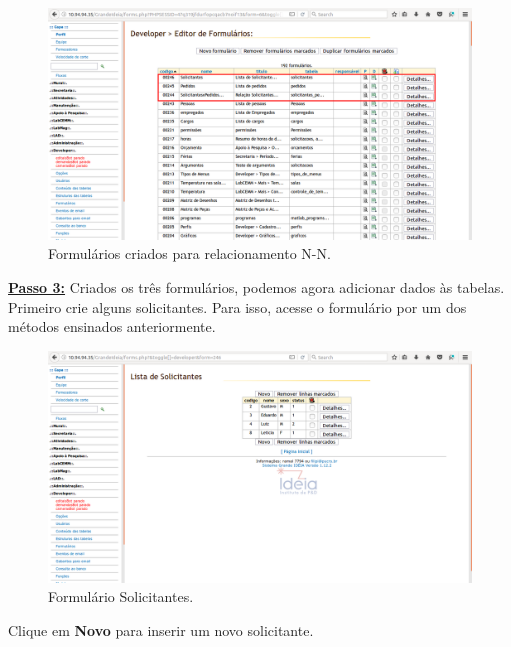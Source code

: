 \documentclass[9pt]{report}
\begin{document}
{       \begin{figure}[H]
        \includegraphics[width=\textwidth]{2_Formularios/4_Relacionamento_N_N/41.png}
        \caption{Formulários criados para relacionamento N-N.}
        \label{fig:formsNN}
       \end{figure}

       \underline{\textbf{Passo 3:}} Criados os três formulários,
       podemos agora adicionar dados às tabelas. Primeiro crie alguns
       solicitantes. Para isso, acesse o formulário por um dos
       métodos ensinados anteriormente.

       \begin{figure}[H]
        \includegraphics[width=\textwidth]{2_Formularios/4_Relacionamento_N_N/42.png}
        \caption{Formulário Solicitantes.}
        \label{fig:formsolicit}
       \end{figure}

       Clique em \textbf{Novo} para inserir um novo solicitante.

}
\end{document}
